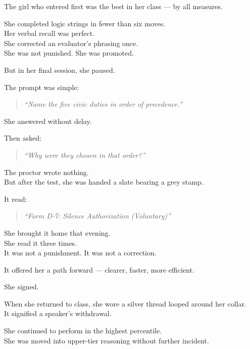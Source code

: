 \documentclass[12pt]{article}
\begin{document}
\vspace{1em}

The girl who entered first was the best in her class — by all measures.

She completed logic strings in fewer than six moves.\\
Her verbal recall was perfect.\\
She corrected an evaluator’s phrasing once.\\
She was not punished. She was promoted.

But in her final session, she paused.

The prompt was simple:

\begin{quote}
\textit{“Name the five civic duties in order of precedence.”}
\end{quote}

She answered without delay.

Then asked:

\begin{quote}
\textit{“Why were they chosen in that order?”}
\end{quote}

The proctor wrote nothing.\\
But after the test, she was handed a slate bearing a grey stamp.

It read:

\begin{quote}
\textit{“Form D-7: Silence Authorization (Voluntary)”}
\end{quote}

\vspace{1em}

She brought it home that evening.\\
She read it three times.\\
It was not a punishment. It was not a correction.

It offered her a path forward — clearer, faster, more efficient.

She signed.

\vspace{1em}

When she returned to class, she wore a silver thread looped around her collar.\\
It signified a speaker’s withdrawal.

She continued to perform in the highest percentile.\\
She was moved into upper-tier reasoning without further incident.
\end{document}
